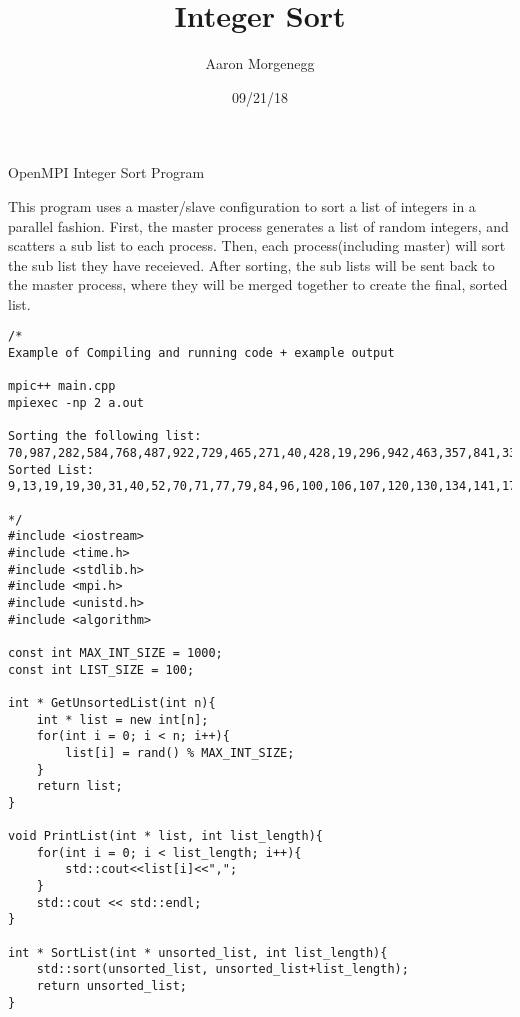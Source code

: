 \documentclass[12pt]{article}
\title{Integer Sort}
\author{Aaron Morgenegg}
\date{09/21/18}
\begin{document}
\maketitle

OpenMPI Integer Sort Program

This program uses a master/slave configuration to sort a list of integers in a parallel fashion. First, the master process generates a list of random integers, and scatters a sub list to each process. Then, each process(including master) will sort the sub list they have receieved. After sorting, the sub lists will be sent back to the master process, where they will be merged together to create the final, sorted list.

\begin{verbatim}
/*
Example of Compiling and running code + example output

mpic++ main.cpp
mpiexec -np 2 a.out

Sorting the following list: 
70,987,282,584,768,487,922,729,465,271,40,428,19,296,942,463,357,841,337,96,312,722,575,31,501,251,840,141,500,668,79,570,655,361,506,776,200,428,857,665,52,898,445,71,194,740,886,903,933,575,999,597,297,927,628,799,530,821,292,30,489,371,600,496,84,106,272,285,886,130,302,938,380,100,9,574,840,895,829,773,823,180,722,120,107,351,271,637,172,563,19,13,286,619,509,723,77,134,360,964,
Sorted List: 
9,13,19,19,30,31,40,52,70,71,77,79,84,96,100,106,107,120,130,134,141,172,180,194,200,209,251,271,271,272,282,285,286,292,296,297,302,312,337,351,357,360,361,371,380,428,428,445,463,465,487,489,496,500,501,506,509,530,563,570,574,575,575,584,597,600,619,628,637,655,665,668,722,722,723,729,740,768,773,776,799,821,823,829,840,840,841,857,886,886,895,898,903,922,927,933,938,942,964,987,

*/
#include <iostream>
#include <time.h>
#include <stdlib.h>
#include <mpi.h>
#include <unistd.h>
#include <algorithm>

const int MAX_INT_SIZE = 1000;
const int LIST_SIZE = 100;

int * GetUnsortedList(int n){
	int * list = new int[n];
	for(int i = 0; i < n; i++){
		list[i] = rand() % MAX_INT_SIZE;
	}
	return list;
}

void PrintList(int * list, int list_length){
	for(int i = 0; i < list_length; i++){
		std::cout<<list[i]<<",";
	}
	std::cout << std::endl;
}

int * SortList(int * unsorted_list, int list_length){
	std::sort(unsorted_list, unsorted_list+list_length);
	return unsorted_list;
}


\end{verbatim}
\end{document}
